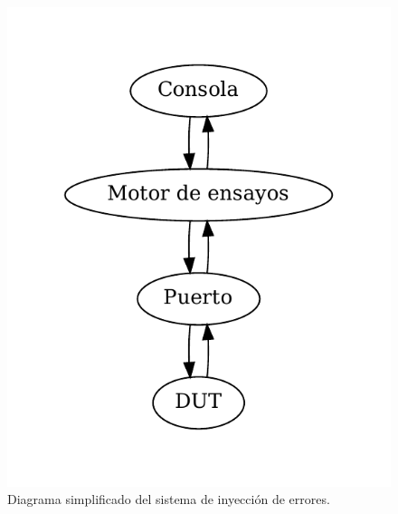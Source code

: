 \begin{figure}[htbp]
	\centering
	\includegraphics[width=.8\textwidth]{./Figures/sisesimple.pdf}
    \caption{Diagrama simplificado del sistema de inyección de errores.}
	\label{fig:sisesimple}
\end{figure}

\label{sec:alcance}
